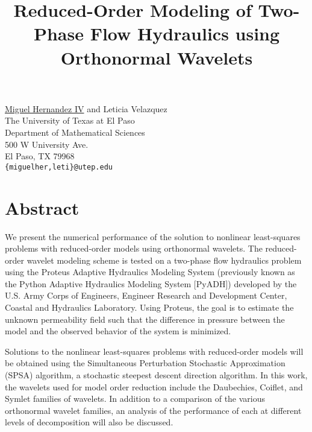

\title{Reduced-Order Modeling of Two-Phase Flow Hydraulics using Orthonormal Wavelets}
\author{} \institute{} %
\maketitle
\begin{center}
{\large \underline{Miguel Hernandez IV} and Leticia Velazquez}\\
The University of Texas at El Paso\\Department of Mathematical Sciences\\500 W University Ave.\\El Paso, TX 79968\\
{\tt \{miguelher,leti\}@utep.edu}\\
\end{center}

\section*{Abstract}

We present the numerical performance of the solution to nonlinear least-squares problems with reduced-order models using orthonormal wavelets.  The reduced-order wavelet modeling scheme is tested on a two-phase flow hydraulics problem using the Proteus Adaptive Hydraulics Modeling System (previously known as the Python Adaptive Hydraulics Modeling System [PyADH]) developed by the U.S. Army Corps of Engineers, Engineer Research and Development Center, Coastal and Hydraulics Laboratory.  Using Proteus, the goal is to estimate the unknown permeability field such that the difference in pressure between the model and the observed behavior of the system is minimized.

Solutions to the nonlinear least-squares problems with reduced-order models will be obtained using the Simultaneous Perturbation Stochastic Approximation (SPSA) algorithm, a stochastic steepest descent direction algorithm.  In this work, the wavelets used for model order reduction include the Daubechies, Coiflet, and Symlet families of wavelets.  In addition to a comparison of the various orthonormal wavelet families, an analysis of the performance of each at different levels of decomposition will also be discussed.


